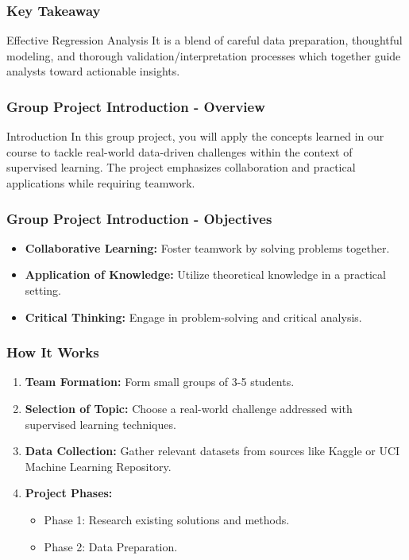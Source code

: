 \documentclass[aspectratio=169]{beamer}
\begin{document}
\begin{frame}[fragile]
    \frametitle{Key Takeaway}
    \begin{block}{Effective Regression Analysis}
        It is a blend of careful data preparation, thoughtful modeling, and thorough validation/interpretation processes which together guide analysts toward actionable insights.
    \end{block}
\end{frame}

\begin{frame}[fragile]
    \frametitle{Group Project Introduction - Overview}
    \begin{block}{Introduction}
        In this group project, you will apply the concepts learned in our course to tackle real-world data-driven challenges within the context of supervised learning. The project emphasizes collaboration and practical applications while requiring teamwork.
    \end{block}
\end{frame}

\begin{frame}[fragile]
    \frametitle{Group Project Introduction - Objectives}
    \begin{itemize}
        \item \textbf{Collaborative Learning:} Foster teamwork by solving problems together.
        \item \textbf{Application of Knowledge:} Utilize theoretical knowledge in a practical setting.
        \item \textbf{Critical Thinking:} Engage in problem-solving and critical analysis.
    \end{itemize}
\end{frame}

\begin{frame}[fragile]
    \frametitle{How It Works}
    \begin{enumerate}
        \item \textbf{Team Formation:} Form small groups of 3-5 students.
        \item \textbf{Selection of Topic:} Choose a real-world challenge addressed with supervised learning techniques.
        \item \textbf{Data Collection:} Gather relevant datasets from sources like Kaggle or UCI Machine Learning Repository.
        \item \textbf{Project Phases:}
            \begin{itemize}
                \item Phase 1: Research existing solutions and methods.
                \item Phase 2: Data Preparation.
            \end{itemize}
    \end{enumerate}
\end{frame}
\end{document}
